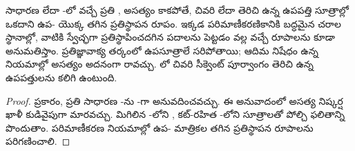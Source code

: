 \documentclass[../../../include/open-logic-section]{subfiles}
\begin{document}
\begin{cor}
సాధారణ  లేదా -లో వచ్చే ప్రతి , అసత్యం కాకపోతే, చివరి  లేదా తెరిచి ఉన్న ఉపపత్తి సూత్రాల్లో ఒకదాని ఉప- యొక్క తగిన ప్రతిస్థాపన రూపం. ఇక్కడ పరిమాణీకరణికానికి బద్ధమైన చరాల స్థానాల్లో, వాటికి స్వేచ్ఛగా ప్రతిస్థాపించదగిన పదాలను పెట్టడం వల్ల వచ్చే రూపాలను కూడా అనుమతిస్తాం. ప్రతిజ్ఞావాక్య తర్కంలో ఉపసూత్రాలే సరిపోతాయి; ఆదిమ నిషేధం ఉన్న నియమాల్లో అసత్యం అదనంగా రావచ్చు. లో చివరి సీక్వెంట్ పూర్వాంగం తెరిచి ఉన్న ఉపపత్తులను కలిగి ఉంటుంది.
\end{cor}

\begin{proof}
   ప్రకారం, ప్రతి సాధారణ -ను -గా అనువదించవచ్చు. ఈ అనువాదంలో అసత్య నిష్కర్ష ఖాళీ కుడివైపుగా మారవచ్చు. మిగిలిన -లోని , కట్-రహిత -లోని సూత్రాలతో పోల్చి ఫలితాన్ని పొందుతాం. పరిమాణీకరణ నియమాల్లో ఉప- మాత్రికల తగిన ప్రతిస్థాపన రూపాలను పరిగణించాలి.
\end{proof}
\end{document}
